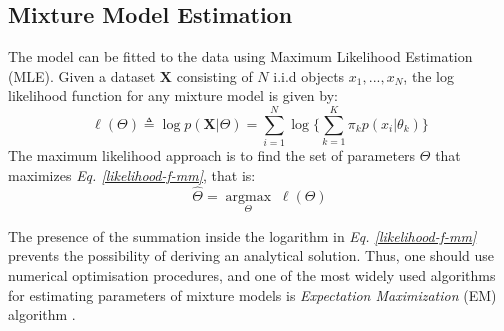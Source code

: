 \subsection{Mixture Model Estimation} \label{mixt-model-estimation-l-subsect}
The model can be fitted to the data using Maximum Likelihood Estimation (MLE). Given a dataset $\mathbf{X}$ consisting of $N$ i.i.d objects $x_{1}, ..., x_{N}$, the log likelihood function for any mixture model is given by:
\begin{equation} \label{likelihood-f-mm}
	\ell(\Theta) \triangleq \log p(\mathbf{X}|\Theta) = \sum_{i=1}^{N} \log \bigg\lbrace \sum_{k=1}^{K}\pi_{k}p(x_{i}|\theta_{k})\bigg\rbrace
\end{equation}
The maximum likelihood approach is to find the set of parameters $\Theta$ that maximizes \emph{Eq. \ref{likelihood-f-mm}}, that is:
\begin{equation} \label{MLE-f-mm}
	\hat{\Theta} =  \underset{\Theta}{\operatorname{argmax}} \; \ell(\Theta)
\end{equation}

The presence of the summation inside the logarithm in \emph{Eq. \ref{likelihood-f-mm}} prevents the possibility of deriving an analytical solution. Thus, one should use numerical optimisation procedures, and one of the most widely used algorithms for estimating parameters of mixture models is \emph{Expectation Maximization} (EM) algorithm \citep{Dempster1977}. 